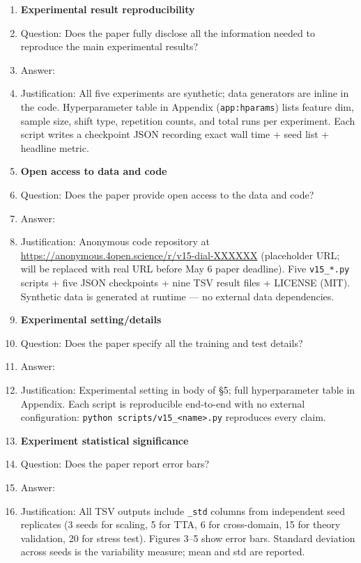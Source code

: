 \begin{enumerate}
\item {\bf Experimental result reproducibility}
    \item[] Question: Does the paper fully disclose all the information needed to reproduce the main experimental results?
    \item[] Answer: \answerYes{}
    \item[] Justification: All five experiments are synthetic; data generators are inline in the code. Hyperparameter table in Appendix (\texttt{app:hparams}) lists feature dim, sample size, shift type, repetition counts, and total runs per experiment. Each script writes a checkpoint JSON recording exact wall time + seed list + headline metric.

\item {\bf Open access to data and code}
    \item[] Question: Does the paper provide open access to the data and code?
    \item[] Answer: \answerYes{}
    \item[] Justification: Anonymous code repository at \url{https://anonymous.4open.science/r/v15-dial-XXXXXX} (placeholder URL; will be replaced with real URL before May 6 paper deadline). Five \texttt{v15\_*.py} scripts + five JSON checkpoints + nine TSV result files + LICENSE (MIT). Synthetic data is generated at runtime — no external data dependencies.

\item {\bf Experimental setting/details}
    \item[] Question: Does the paper specify all the training and test details?
    \item[] Answer: \answerYes{}
    \item[] Justification: Experimental setting in body of \S5; full hyperparameter table in Appendix. Each script is reproducible end-to-end with no external configuration: \texttt{python scripts/v15\_<name>.py} reproduces every claim.

\item {\bf Experiment statistical significance}
    \item[] Question: Does the paper report error bars?
    \item[] Answer: \answerYes{}
    \item[] Justification: All TSV outputs include \texttt{\_std} columns from independent seed replicates (3 seeds for scaling, 5 for TTA, 6 for cross-domain, 15 for theory validation, 20 for stress test). Figures 3–5 show error bars. Standard deviation across seeds is the variability measure; mean and std are reported.


\end{enumerate}
